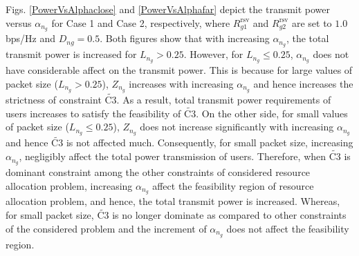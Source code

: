\documentclass[journal,draftclsnofoot,12pt,onecolumn]{IEEEtran}
\begin{document}
{Figs. \ref{PowerVsAlphaclose} and \ref{PowerVsAlphafar} depict the transmit power versus ${\alpha}_{n_g}$ for Case 1 and Case 2, respectively, where $R_{g1}^\text{rsv}$ and $R_{g2}^\text{rsv}$ are set to $1.0$ bps/Hz and {$D_{ng} = 0.5$}. Both figures show that with increasing ${\alpha}_{n_g}$, the total transmit power is increased for ${L}_{n_g}>0.25$. However, for ${L}_{n_g}\leq 0.25$, ${\alpha}_{n_g}$ does not have considerable affect on the transmit power. This is because for large values of packet size (${L}_{n_g}>0.25$), $Z_{n_g}$ increases with increasing $\alpha_{n_g}$ and hence increases the strictness of constraint $\widetilde{\text{C3}}$. As a result, total transmit power requirements of users increases to satisfy the feasibility of  $\widetilde{\text{C3}}$. On the other side, for small values of  packet size (${L}_{n_g}\leq 0.25$), $Z_{n_g}$ does not increase significantly with increasing $\alpha_{n_g}$ and hence $\widetilde{\text{C3}}$ is not affected much. Consequently, for small packet size, increasing $\alpha_{n_g}$, negligibly affect the total power transmission of users. Therefore, when $\widetilde{\text{C3}}$ is dominant constraint among the other constraints of considered resource allocation problem, increasing ${\alpha}_{n_g}$ affect the feasibility region of resource allocation problem, and hence, the total transmit power is increased. Whereas, for small packet size, $\widetilde{\text{C3}}$ is no longer dominate as compared to other constraints of the considered problem and the increment of ${\alpha}_{n_g}$ does not affect the feasibility region.}

\end{document}
